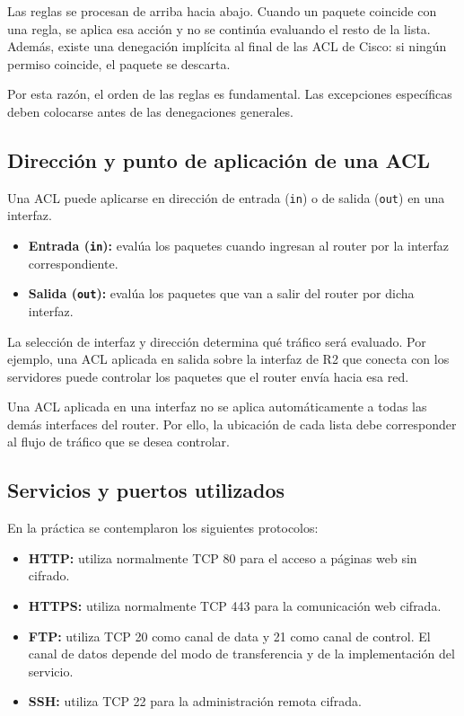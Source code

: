\documentclass[12pt,a4paper]{article}
\begin{document}
Las reglas se procesan de arriba hacia abajo. Cuando un paquete
coincide con una regla, se aplica esa acción y no se continúa
evaluando el resto de la lista. Además, existe una denegación
implícita al final de las ACL de Cisco: si ningún permiso coincide,
el paquete se descarta.

Por esta razón, el orden de las reglas es fundamental. Las
excepciones específicas deben colocarse antes de las denegaciones
generales.

\subsection{Dirección y punto de aplicación de una ACL}

Una ACL puede aplicarse en dirección de entrada (\texttt{in})
o de salida (\texttt{out}) en una interfaz.

\begin{itemize}
    \item \textbf{Entrada (\texttt{in}):} evalúa los paquetes cuando
    ingresan al router por la interfaz correspondiente.
    \item \textbf{Salida (\texttt{out}):} evalúa los paquetes que
    van a salir del router por dicha interfaz.
\end{itemize}

La selección de interfaz y dirección determina qué tráfico será
evaluado. Por ejemplo, una ACL aplicada en salida sobre la interfaz
de R2 que conecta con los servidores puede controlar los paquetes
que el router envía hacia esa red.

Una ACL aplicada en una interfaz no se aplica automáticamente
a todas las demás interfaces del router. Por ello, la ubicación
de cada lista debe corresponder al flujo de tráfico que se desea
controlar.

\subsection{Servicios y puertos utilizados}

En la práctica se contemplaron los siguientes protocolos:

\begin{itemize}
    \item \textbf{HTTP:} utiliza normalmente TCP 80 para el acceso
    a páginas web sin cifrado.
    \item \textbf{HTTPS:} utiliza normalmente TCP 443 para la
    comunicación web cifrada.
    \item \textbf{FTP:} utiliza TCP 20 como canal de data y 21 como canal de control.
    El canal de datos depende del modo de transferencia y de
    la implementación del servicio.
    \item \textbf{SSH:} utiliza TCP 22 para la administración
    remota cifrada.
\end{itemize}
\end{document}
